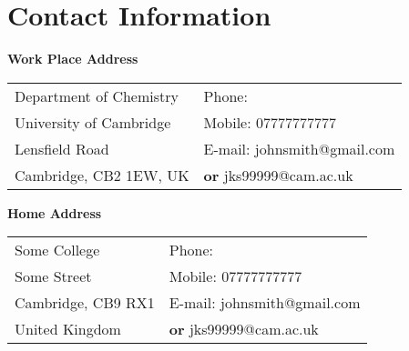 % 
%
% 
%

%
%






\section{Contact Information}
%
%
%
\newlength{\rcollength}\setlength{\rcollength}{2.15in}%
%

\vspace{-5pt}
\textbf{Work Place Address}
\vspace{3pt}

\begin{tabular}[t]{@{}p{\textwidth-\rcollength-.3in}p{\rcollength}}
  Department of Chemistry       & Phone:                        \\
  University of Cambridge       & Mobile: 07777777777           \\
  Lensfield Road                & E-mail: johnsmith@gmail.com   \\
  Cambridge, CB2 1EW, UK        & {\bf or} jks99999@cam.ac.uk   \\
\end{tabular}

\vspace{8pt}
\textbf{Home Address}
\vspace{3pt}

\begin{tabular}[t]{@{}p{\textwidth-\rcollength-.3in}p{\rcollength}}
  Some College                  & Phone:                        \\
  Some Street                   & Mobile: 07777777777           \\
  Cambridge, CB9 RX1            & E-mail: johnsmith@gmail.com   \\
  United Kingdom                & {\bf or} jks99999@cam.ac.uk   \\
\end{tabular}

